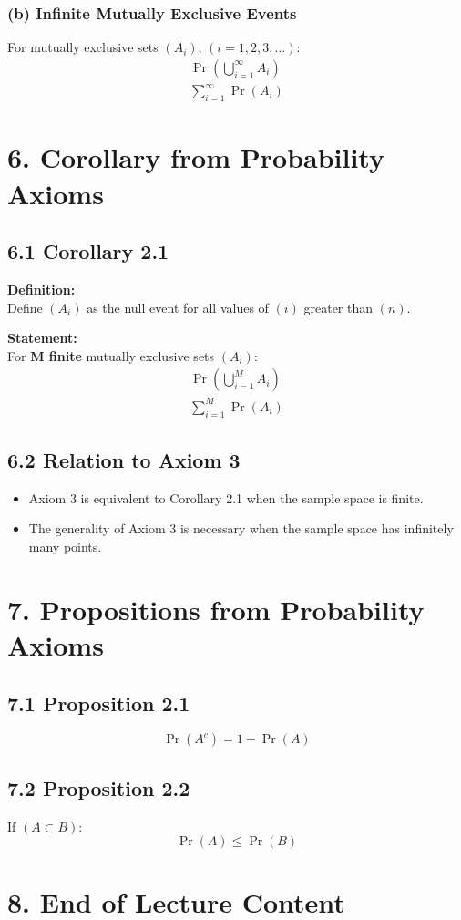 \documentclass[12pt]{article}
\begin{document}
\subsubsection*{(b) Infinite Mutually Exclusive Events}

For mutually exclusive sets $( A_i )$, $( i = 1,2,3,\ldots )$:
\[
\begin{array}{c}
\Pr\left(\bigcup_{i=1}^{\infty} A_i\right) \\
\hline
\sum_{i=1}^{\infty} \Pr(A_i)
\end{array}
\]

\section*{6. Corollary from Probability Axioms}

\subsection*{6.1 Corollary 2.1}

\textbf{Definition:}\\
Define $( A_i )$ as the null event for all values of $( i )$ greater than $( n )$.

\textbf{Statement:}\\
For \textbf{M finite} mutually exclusive sets $( A_i )$:
\[
\begin{array}{c}
\Pr\left(\bigcup_{i=1}^{M} A_i\right) \\
\hline
\sum_{i=1}^{M} \Pr(A_i)
\end{array}
\]

\subsection*{6.2 Relation to Axiom 3}

\begin{itemize}
  \item Axiom 3 is equivalent to Corollary 2.1 when the sample space is finite.
  \item The generality of Axiom 3 is necessary when the sample space has infinitely many points.
\end{itemize}

\section*{7. Propositions from Probability Axioms}

\subsection*{7.1 Proposition 2.1}

\[
\Pr(A^c) = 1 - \Pr(A)
\]

\subsection*{7.2 Proposition 2.2}

If $( A \subset B )$:
\[
\Pr(A) \leq \Pr(B)
\]

\section*{8. End of Lecture Content}
\end{document}
